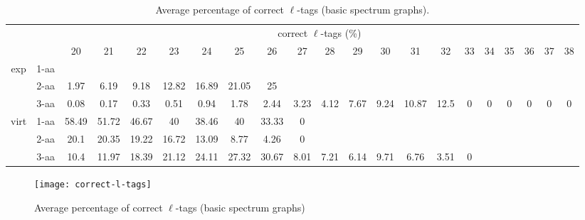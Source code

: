 \documentclass{article}[12pt]
\begin{document}
\begin{landscape}
\begin{table}[h]\tiny
\vspace{3mm}
{\centering
\begin{center}
\begin{tabular}{|c|l|c|c|c|c|c|c|c|c|c|c|c|c|c|c|c|c|c|c|c|}
  \hline
  \multicolumn{2}{|c|}{ } & \multicolumn{ 19 }{|c|}{ correct $\ell$-tags (\%)} \\
  \cline{3- 21}
  \multicolumn{2}{|c|}{ }  & 20 & 21 & 22 & 23 & 24 & 25 & 26 & 27 & 28 & 29 & 30 & 31 & 32 & 33 & 34 & 35 & 36 & 37 & 38\\
  \hline
  \multirow{3}{*}{exp}
&  1-aa  &  &  &  &  &  &  &  &  &  &  &  &  &  &  &  &  &  &  & \\
&  2-aa  & 1.97 & 6.19 & 9.18 & 12.82 & 16.89 & 21.05 & 25 &  &  &  &  &  &  &  &  &  &  &  & \\
&  3-aa  & 0.08 & 0.17 & 0.33 & 0.51 & 0.94 & 1.78 & 2.44 & 3.23 & 4.12 & 7.67 & 9.24 & 10.87 & 12.5 & 0 & 0 & 0 & 0 & 0 & 0\\
 \hline
  \multirow{3}{*}{virt} 
&  1-aa  & 58.49 & 51.72 & 46.67 & 40 & 38.46 & 40 & 33.33 & 0 &  &  &  &  &  &  &  &  &  &  & \\
&  2-aa  & 20.1 & 20.35 & 19.22 & 16.72 & 13.09 & 8.77 & 4.26 & 0 &  &  &  &  &  &  &  &  &  &  & \\
&  3-aa  & 10.4 & 11.97 & 18.39 & 21.12 & 24.11 & 27.32 & 30.67 & 8.01 & 7.21 & 6.14 & 9.71 & 6.76 & 3.51 & 0 &  &  &  &  & \\
 \hline
\end{tabular}
\end{center}
\par}
\centering
\caption{ Average percentage of correct $\ell$-tags (basic spectrum graphs).}
\label{table:correct-l-tags}
\vspace{3mm}
\end{table}

\end{landscape}

\begin{figure}
  \begin{center}
\texttt{[image: correct-l-tags]}
\end{center}
\caption{Average percentage of correct $\ell$-tags (basic spectrum graphs)}
  \label{fig:correct-l-tags}
\end{figure}
\end{document}
